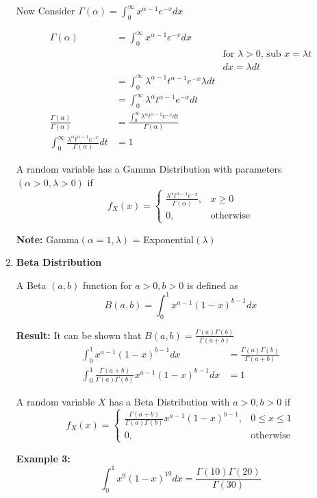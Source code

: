 \documentclass[12pt]{article}
\begin{document}
\begin{enumerate}
{	Now Consider $\Gamma (\alpha) = \int^\infty_0 x^{\alpha - 1} e^{-x} dx$

	\begin{align*}
		\Gamma (\alpha) &= \int^\infty_0 x^{\alpha - 1} e^{-x} dx\\
		&& \text{for $\lambda > 0$, sub } x = \lambda t\\
		&& dx = \lambda dt\\
		&= \int^\infty_0 \lambda^{\alpha - 1} t^{\alpha - 1} e^{-x} \lambda dt\\
		&= \int^\infty_0 \lambda^{\alpha} t^{\alpha - 1} e^{-x} dt\\
		\frac{\Gamma (\alpha)}{\Gamma (\alpha)} &= \frac{\int^\infty_0 \lambda^{\alpha} t^{\alpha - 1} e^{-x} dt}{\Gamma (\alpha)}\\
		\int^\infty_0 \frac{\lambda^{\alpha} t^{\alpha - 1} e^{-x}}{\Gamma (\alpha)} dt &= 1
	\end{align*}
	
	\begin{tcolorbox}[title=Definition: Gamma Distribution]
		A random variable has a Gamma Distribution with parameters $(\alpha > 0, \lambda > 0)$ if
		$$f_X (x) = 
		\begin{cases}
		\frac{\lambda^{\alpha} t^{\alpha - 1} e^{-x}}{\Gamma (\alpha)}, & x \geq 0\\
		0, & \text{otherwise}
		\end{cases}
$$
	\end{tcolorbox}

	\textbf{Note:} Gamma$(\alpha = 1, \lambda)$ = Exponential$(\lambda)$
	
	}
	\item{
	\textbf{Beta Distribution}\\
	\begin{tcolorbox}[title=Definition: Beta Function]
		A Beta $(a,b)$ function for $a > 0, b > 0$ is defined as
		$$B(a,b) = \int^1_0 x^{a - 1} (1-x)^{b-1} dx$$
	\end{tcolorbox}

	\textbf{Result:} It can be shown that $B(a,b) = \frac{\Gamma (a) \Gamma (b)}{\Gamma (a+b)}$
	\begin{align*}
		\int^1_0 x^{a - 1} (1-x)^{b-1} dx &= \frac{\Gamma (a) \Gamma (b)}{\Gamma (a+b)}\\
		\int^1_0 \frac{\Gamma (a+b)}{\Gamma (a) \Gamma (b)} x^{a - 1} (1-x)^{b-1} dx &= 1
	\end{align*}

	\begin{tcolorbox}[title=Beta Distribution]
		A random variable $X$ has a Beta Distribution with $a > 0, b > 0$ if
		$$f_X (x) = \begin{cases}
		\frac{\Gamma (a+b)}{\Gamma (a) \Gamma (b)} x^{a - 1} (1-x)^{b-1}, & 0 \leq x \leq 1\\
		0, & \text{otherwise}
		\end{cases}
		$$
	\end{tcolorbox}

	\textbf{Example 3:} $$\int^1_0 x^9 (1-x)^{19} dx = \frac{\Gamma (10)\Gamma (20)}{\Gamma (30)}$$

	}
\end{enumerate}
\end{document}
